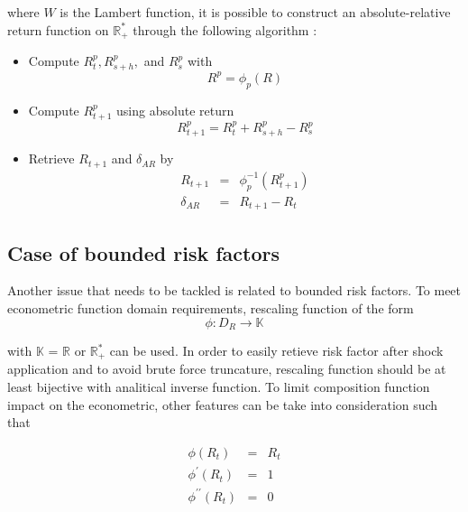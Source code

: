 \documentclass[3pt]{article}
\begin{document}
where $W$ is the Lambert function, it is possible to construct an
absolute-relative return function on $\mathbb{R}_{+}^{\ast }$ through the
following algorithm :

\bigskip 

\begin{itemize}
\item Compute $R_{t}^{p},R_{s+h}^{p},$ and $R_{s}^{p}$ with 
\begin{equation*}
R^{p}=\phi _{p}(R)
\end{equation*}

\item Compute $R_{t+1}^{p}$ using absolute return 
\begin{equation*}
R_{t+1}^{p}=R_{t}^{p}+R_{s+h}^{p}-R_{s}^{p}
\end{equation*}

\item Retrieve $R_{t+1}$ and $\delta _{AR}$ by 
\begin{eqnarray*}
R_{t+1} &=&\phi _{p}^{-1}(R_{t+1}^{p}) \\
\delta _{AR} &=&R_{t+1}-R_{t}
\end{eqnarray*}
\end{itemize}

\subsection{Case of bounded risk factors}

Another issue that needs to be tackled is related to bounded risk factors.
To meet econometric function domain requirements, rescaling function of the
form 
\begin{equation*}
\phi :D_{R}\rightarrow \mathbb{K}
\end{equation*}

with $\mathbb{K}$ = $\mathbb{R}$ or $\mathbb{R}_{+}^{\ast }$ can be used. In
order to easily retieve risk factor after shock application and to avoid
brute force truncature, rescaling function should be at least bijective with
analitical inverse function. To limit composition function impact on the
econometric, other features can be take into consideration such that 

\begin{eqnarray*}
\phi (R_{t}) &=&R_{t} \\
\phi ^{\prime }(R_{t}) &=&1 \\
\phi ^{\prime \prime }(R_{t}) &=&0
\end{eqnarray*}
\end{document}
